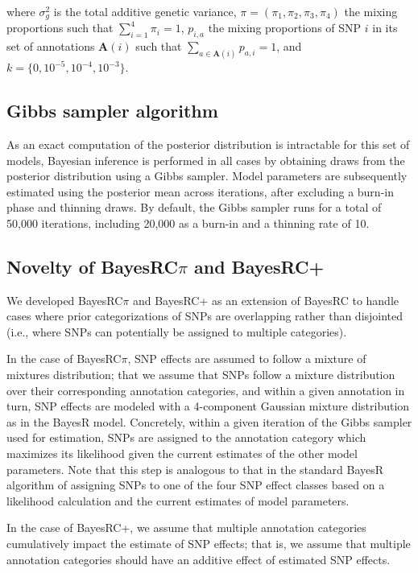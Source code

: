 \documentclass{ol-softwaremanual}
\begin{document}
\noindent where $\sigma_g^2$ is the total additive genetic variance, $\pi=(\pi_1,\pi_2,\pi_3,\pi_4)$ the mixing proportions such that $\sum_{i=1}^4\pi_i=1$, $p_{i,a}$ the mixing proportions of SNP $i$ in its set of annotations $\mathbf{A}(i)$ such that $\sum_{a \in \mathbf{A}(i)}p_{a,i}=1$, and $k=\{0,10^{-5}, 10^{-4}, 10^{-3}\}$.

\subsection{Gibbs sampler algorithm}

As an exact computation of the posterior distribution is intractable for this set of models, Bayesian inference is performed in all cases by obtaining draws from the posterior distribution using a Gibbs sampler. Model parameters are subsequently estimated using the posterior mean across iterations, after excluding a burn-in phase and thinning draws. By default, the Gibbs sampler runs for a total of 50,000 iterations, including 20,000 as a burn-in and a thinning rate of 10.

\subsection{Novelty of BayesRC$\pi$ and BayesRC+}

We developed BayesRC$\pi$ and BayesRC+ as an extension of BayesRC to handle cases where prior categorizations of SNPs are overlapping rather than disjointed (i.e., where SNPs can potentially be assigned to multiple categories). 

In the case of BayesRC$\pi$, SNP effects are assumed to follow a mixture of mixtures distribution; that we assume that SNPs follow a mixture distribution over their corresponding annotation categories, and within a given annotation in turn, SNP effects are modeled with a 4-component Gaussian mixture distribution as in the BayesR model. Concretely, within a given iteration of the Gibbs sampler used for estimation, SNPs are assigned to the annotation category which maximizes its likelihood given the current estimates of the other model parameters. Note that this step is analogous to that in the standard BayesR algorithm of assigning SNPs to one of the four SNP effect classes based on a likelihood calculation and the current estimates of model parameters. 

In the case of BayesRC+, we assume that multiple annotation categories cumulatively impact the estimate of SNP effects; that is, we assume that multiple annotation categories should have an additive effect of estimated SNP effects. 
\end{document}
